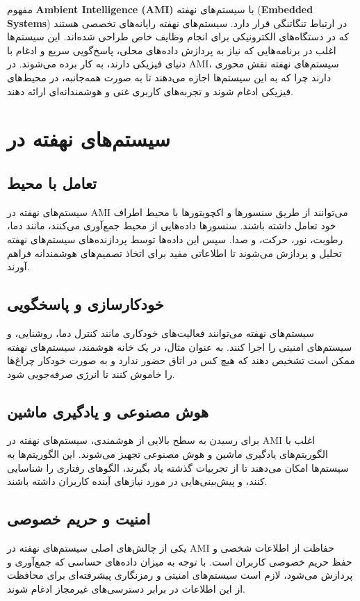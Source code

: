 مفهوم \textbf{Ambient Intelligence (AMI)} با سیستم‌های نهفته (\textbf{Embedded Systems}) در ارتباط تنگاتنگی قرار دارد. سیستم‌های نهفته رایانه‌های تخصصی هستند که در دستگاه‌های الکترونیکی برای انجام وظایف خاص طراحی شده‌اند. این سیستم‌ها اغلب در برنامه‌هایی که نیاز به پردازش داده‌های محلی، پاسخ‌گویی سریع و ادغام با دنیای فیزیکی دارند، به کار برده می‌شوند. در AMI، سیستم‌های نهفته نقش محوری دارند چرا که به این سیستم‌ها اجازه می‌دهند تا به صورت همه‌جانبه، در محیط‌های فیزیکی ادغام شوند و تجربه‌های کاربری غنی و هوشمندانه‌ای ارائه دهند.

\section*{سیستم‌های نهفته در }

\subsection*{تعامل با محیط}
سیستم‌های نهفته در AMI می‌توانند از طریق سنسورها و اکچویتورها با محیط اطراف خود تعامل داشته باشند. سنسورها داده‌هایی از محیط جمع‌آوری می‌کنند، مانند دما، رطوبت، نور، حرکت، و صدا. سپس این داده‌ها توسط پردازنده‌های سیستم‌های نهفته تحلیل و پردازش می‌شوند تا اطلاعاتی مفید برای اتخاذ تصمیم‌های هوشمندانه فراهم آورند.

\subsection*{خودکارسازی و پاسخگویی}
سیستم‌های نهفته می‌توانند فعالیت‌های خودکاری مانند کنترل دما، روشنایی، و سیستم‌های امنیتی را اجرا کنند. به عنوان مثال، در یک خانه هوشمند، سیستم‌های نهفته ممکن است تشخیص دهند که هیچ کس در اتاق حضور ندارد و به صورت خودکار چراغ‌ها را خاموش کنند تا انرژی صرفه‌جویی شود.

\subsection*{هوش مصنوعی و یادگیری ماشین}
برای رسیدن به سطح بالایی از هوشمندی، سیستم‌های نهفته در AMI اغلب با الگوریتم‌های یادگیری ماشین و هوش مصنوعی تجهیز می‌شوند. این الگوریتم‌ها به سیستم‌ها امکان می‌دهند تا از تجربیات گذشته یاد بگیرند، الگوهای رفتاری را شناسایی کنند، و پیش‌بینی‌هایی در مورد نیازهای آینده کاربران داشته باشند.

\subsection*{امنیت و حریم خصوصی}
یکی از چالش‌های اصلی سیستم‌های نهفته در AMI حفاظت از اطلاعات شخصی و حفظ حریم خصوصی کاربران است. با توجه به میزان داده‌های حساسی که جمع‌آوری و پردازش می‌شود، لازم است سیستم‌های امنیتی و رمزنگاری پیشرفته‌ای برای محافظت از این اطلاعات در برابر دسترسی‌های غیرمجاز ادغام شوند.

